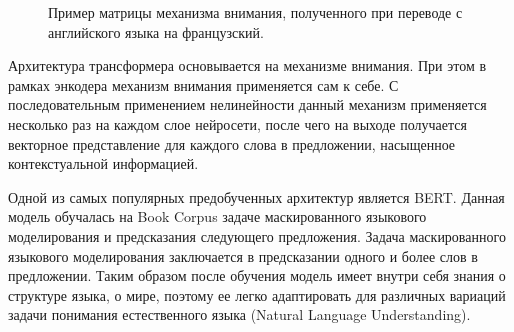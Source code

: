 \begin{figure}[H]
 \caption{Пример матрицы механизма внимания, полученного при переводе с английского языка на французский.}
\end{figure}

Архитектура трансформера основывается на механизме внимания. При этом в рамках энкодера механизм внимания применяется сам к себе. С последовательным применением нелинейности данный механизм применяется несколько раз на каждом слое нейросети, после чего на выходе получается векторное представление для каждого слова в предложении, насыщенное контекстуальной информацией.

Одной из самых популярных предобученных архитектур является BERT. Данная модель обучалась на Book Corpus задаче маскированного языкового моделирования и предсказания следующего предложения. Задача маскированного языкового  моделирования заключается в предсказании одного и более слов в предложении. Таким образом после обучения модель имеет внутри себя знания о структуре языка, о мире, поэтому ее легко адаптировать для различных вариаций задачи понимания естественного языка (Natural Language Understanding).


